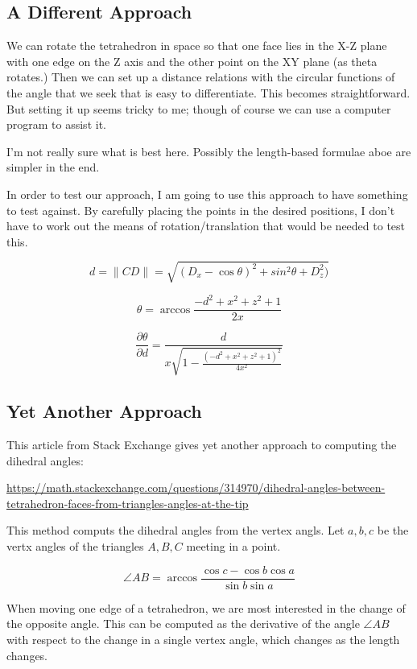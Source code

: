 \documentclass[11pt]{article}
\begin{document}
\subsection{A Different Approach}

We can rotate the tetrahedron in space so that one face lies in the X-Z plane with
one edge on the Z axis and the other point on the XY plane (as theta rotates.)
Then we can set up a distance relations with the circular
functions of the angle that we seek that is easy to differentiate. This
becomes straightforward. But setting it up seems tricky to me; though
of course we can use a computer program to assist it.

I'm not really sure what is best here. Possibly the length-based formulae
aboe are simpler in the end.

In order to test our approach, I am going to use this approach to have
something to test against.  By carefully placing the points in the desired
positions, I don't have to work out the means of rotation/translation
that would be needed to test this.

\[
d = \|CD \| = \sqrt{(D_x - \cos{\theta})^2 + sin^2{\theta} + D_z^2)}
\]

\[
\theta = \arccos{\frac{-d^2 + x^2 + z^2 + 1}{2 x}}
\]

\[
\frac{\partial \theta }{\partial d}   =  \frac{d}{x \sqrt{1 - \frac{(-d^2 + x^2 + z^2 + 1)^2}{4 x^2}}}
\]

\subsection{Yet Another Approach}

This article from Stack Exchange gives yet another approach to computing the
dihedral angles:

\url{https://math.stackexchange.com/questions/314970/dihedral-angles-between-tetrahedron-faces-from-triangles-angles-at-the-tip}

This method computs the dihedral angles from the vertex angls. Let $a,b,c$ be the
vertx angles of the triangles $A,B,C$ meeting in a point.

\[
\angle AB =\arccos{\frac{\cos{c} - \cos{b}\cos{a}}{\sin{b}\sin{a}}}
\]

When moving one edge of a tetrahedron, we are most interested in the change of
the opposite angle. This can be computed as the derivative of the angle $\angle AB$
with respect to the change in a single vertex angle, which changes as the length
changes.
\end{document}
